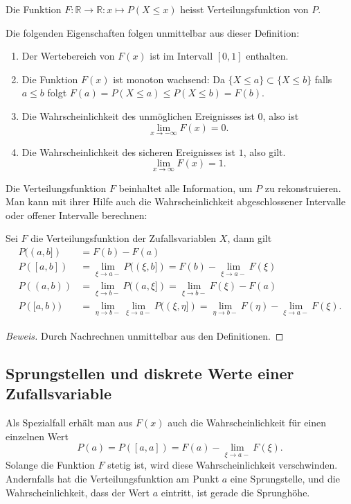 \begin{definition}
\label{verteilung:definition:verteilungsfunktion}
Die Funktion $F\colon\mathbb{R}\to\mathbb{R}:x\mapsto P(X\le x)$
heisst Verteilungsfunktion von $P$.
\end{definition}
Die folgenden Eigenschaften folgen unmittelbar aus dieser Definition:
\begin{enumerate}
\item Der Wertebereich von $F(x)$ ist im Intervall $[0,1]$ enthalten.
\item Die Funktion $F(x)$ ist monoton wachsend:
Da $\{ X \le a\} \subset \{X\le b\}$ falls $a\le b$ folgt
$F(a)=P(X\le a)\le P(X\le b)=F(b)$.
\item
Die Wahrscheinlichkeit des unmöglichen Ereignisses ist $0$, also
ist
\[
\lim_{x\to-\infty}F(x)=0.
\]
\item
Die Wahrscheinlichkeit des sicheren Ereignisses ist $1$, also gilt.
\[
\lim_{x\to\infty}F(x)=1.
\]
\end{enumerate}

Die Verteilungsfunktion $F$ beinhaltet alle Information, um $P$ zu
rekonstruieren.
Man kann mit ihrer Hilfe auch die Wahrscheinlichkeit
abgeschlossener Intervalle oder offener Intervalle berechnen:
\begin{satz} Sei $F$ die Verteilungsfunktion der Zufallsvariablen $X$,
dann gilt
\begin{align*}
P((a,b])&=F(b)-F(a)\\
P([a,b])&=\lim_{\xi\to a-} P((\xi,b])=F(b)-\lim_{\xi\to a-}F(\xi)\\
P((a,b))&=\lim_{\xi\to b-} P((a,\xi])=\lim_{\xi\to b-}F(\xi)-F(a)\\
P([a,b))&=\lim_{\eta\to b-}\lim_{\xi\to a-} P((\xi,\eta])=\lim_{\eta\to b-}F(\eta)-\lim_{\xi\to a-}F(\xi).
\end{align*}
\end{satz}
\begin{proof}[Beweis]Durch Nachrechnen unmittelbar aus den Definitionen.
\end{proof}

\subsection{Sprungstellen und diskrete Werte einer Zufallsvariable}
Als Spezialfall erhält man aus $F(x)$ auch die Wahrscheinlichkeit für einen
einzelnen Wert
\[
P(a)=P([a,a])=F(a)-\lim_{\xi\to a-}F(\xi).
\]
Solange die Funktion $F$ stetig ist, wird diese Wahrscheinlichkeit
verschwinden.
Andernfalls hat die Verteilungsfunktion am Punkt $a$ eine
Sprungstelle, und die Wahrscheinlichkeit, dass der Wert $a$ eintritt,
ist gerade die Sprunghöhe.

